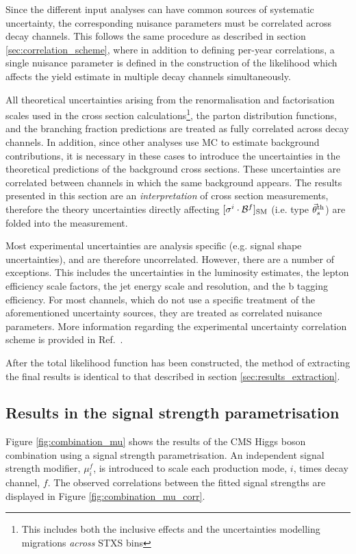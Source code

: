 Since the different input analyses can have common sources of systematic uncertainty, the corresponding nuisance parameters must be correlated across decay channels. This follows the same procedure as described in section \ref{sec:correlation_scheme}, where in addition to defining per-year correlations, a single nuisance parameter is defined in the construction of the likelihood which affects the yield estimate in multiple decay channels simultaneously. 

All theoretical uncertainties arising from the renormalisation and factorisation scales used in the cross section calculations\footnote{This includes both the inclusive effects and the uncertainties modelling migrations \textit{across} STXS bins}, the parton distribution functions, and the branching fraction predictions are treated as fully correlated across decay channels. In addition, since other analyses use MC to estimate background contributions, it is necessary in these cases to introduce the uncertainties in the theoretical predictions of the background cross sections. These uncertainties are correlated between channels in which the same background appears. The results presented in this section are an \textit{interpretation} of cross section measurements, therefore the theory uncertainties directly affecting $[\sigma^i \cdot \mathcal{B}^{f}]_{\rm{SM}}$ (i.e. type $\vec{\theta}_s^{\rm{th}}$) are folded into the measurement.

Most experimental uncertainties are analysis specific (e.g. \mgg signal shape uncertainties), and are therefore uncorrelated. However, there are a number of exceptions. This includes the uncertainties in the luminosity estimates, the lepton efficiency scale factors, the jet energy scale and resolution, and the b tagging efficiency. For most channels, which do not use a specific treatment of the aforementioned uncertainty sources, they are treated as correlated nuisance parameters. More information regarding the experimental uncertainty correlation scheme is provided in Ref.~\cite{CMS-PAS-HIG-19-005}.

After the total likelihood function has been constructed, the method of extracting the final results is identical to that described in section \ref{sec:results_extraction}.

\subsection{Results in the signal strength parametrisation}
Figure \ref{fig:combination_mu} shows the results of the CMS Higgs boson combination using a signal strength parametrisation. An independent signal strength modifier, $\mu_i^f$, is introduced to scale each production mode, $i$, times decay channel, $f$. The observed correlations between the fitted signal strengths are displayed in Figure \ref{fig:combination_mu_corr}.

